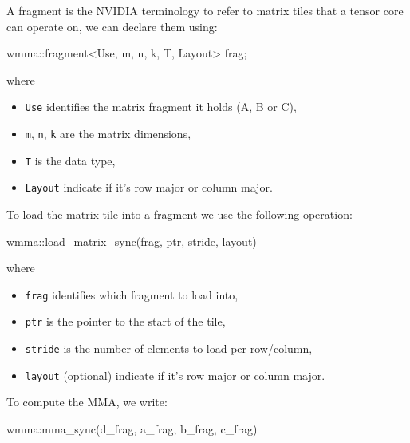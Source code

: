        \begin{tcolorbox}[violet]
            A fragment is the NVIDIA terminology to refer to matrix tiles that a tensor core can operate on, we can declare them using:
            \begin{codeCenter}
            \begin{Ccode}
wmma::fragment<Use, m, n, k, T, Layout> frag;
            \end{Ccode}
            \end{codeCenter}
            where 
            \begin{itemize}[left=10pt, label=\textbullet]
                \item \texttt{Use} identifies the matrix fragment it holds (A, B or C), 
                \item \texttt{m}, \texttt{n}, \texttt{k} are the matrix dimensions, 
                \item \texttt{T} is the data type, 
                \item \texttt{Layout} indicate if it's row major or column major.
            \end{itemize}
            To load the matrix tile into a fragment we use the following operation:
            \begin{codeCenter}
            \begin{Ccode}
wmma::load_matrix_sync(frag, ptr, stride, layout)
            \end{Ccode}
            \end{codeCenter}
            where 
            \begin{itemize}[left=10pt, label=\textbullet]
                \item \texttt{frag}  identifies which fragment to load into, 
                \item \texttt{ptr} is the pointer to the start of the tile, 
                \item \texttt{stride} is the number of elements to load per row/column, 
                \item \texttt{layout} (optional) indicate if it's row major or column major. 
            \end{itemize}
            To compute the MMA, we write:
            \begin{codeCenter}
            \begin{Ccode}
wmma:mma_sync(d_frag, a_frag, b_frag, c_frag)
            \end{Ccode}
            \end{codeCenter}

\end{tcolorbox}
